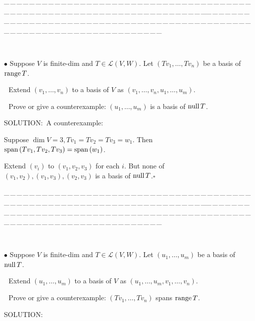 \documentclass[a4paper, 11pt, UTF8]{article}
\def\range{\textup{range}\,}
\def\null{\textup{null\,}}
\def\Spn{\textup{span}\,}
\def\Lm{\mathcal{L}}
\begin{document}
\begin{large}
{\tiny \_\,\_\,\_\,\_\,\_\,\_\,\_\,\_\,\_\,\_\,\_\,\_\,\_\,\_\,\_\,\_\,\_\,\_\,\_\,\_\,\_\,\_\,\_\,\_\,\_\,\_\,\_\,\_\,\_\,\_\,\_\,\_\,\_\,\_\,\_\,\_\,\_\,\_\,\_\,\_\,\_\,\_\,\_\,\_\,\_\,\_\,\_\,\_\,\_\,\_\,\_\,\_\,\_\,\_\,\_\,\_\,\_\,\_\,\_\,\_\,\_\,\_\,\_\,\_\,\_\,\_\,\_\,\_\,\_\,\_\,\_\_\,\_\,\_\,\_\,\_\,\_\,\_\,\_\,\_\,\_\,\_\,\_\,\_\,\_\,\_\,\_\,\_\,\_\,\_\,\_\,\_\,\_\,\_\,\_\,\_\,\_\,\_\,\_\,\_\,\_\,\_\,\_\,\_\,\_\,\_\,\_\,\_\,\_\,\_\,\_\,\_\,\_\,\_\,\_\,\_\,\_\,\_\,\_\,\_\,\_\,\_\,\_\,\_\,\_\,\_\,\_\,\_\,\_\,\_\,\_\,\_\,\_\,\_\,\_\,\_\,\_\,\_\,\_\,\_\,\_\,\_}{\tiny\,\par}
{\small $\bullet$} {\timessl\Large Suppose $V$ is finite-dim and $T\in\Lm(V,W)$. Let $(Tv_1,\dots,Tv_n)$ be a basis of $\range T$.}\par\,\,
{\timessl\Large Extend $(v_1,\dots,v_n)$ to a basis of $V$ as $(v_1,\dots,v_n,u_1,\dots,u_m)$.}\par\,\,
{\timessl\Large Prove or give a counterexample: $(u_1,\dots,u_m)$ is a basis of $\null T$.}\par
{\timesbf S\footnotesize{OLUTION:}}\,\,\,A counterexample:\par\quad
Suppose $\dim V=3, Tv_1=Tv_2=Tv_3=w_1.$ Then $\Spn(Tv_1,Tv_2,Tv_3)=\Spn(w_1)$.\par\quad
Extend $(v_i)$ to $(v_1,v_2,v_3)$ for each $i$. But none of $(v_1,v_2),(v_1,v_3),(v_2,v_3)$ is a basis of $\null T$.\quad$\square$\par
{\tiny \_\,\_\,\_\,\_\,\_\,\_\,\_\,\_\,\_\,\_\,\_\,\_\,\_\,\_\,\_\,\_\,\_\,\_\,\_\,\_\,\_\,\_\,\_\,\_\,\_\,\_\,\_\,\_\,\_\,\_\,\_\,\_\,\_\,\_\,\_\,\_\,\_\,\_\,\_\,\_\,\_\,\_\,\_\,\_\,\_\,\_\,\_\,\_\,\_\,\_\,\_\,\_\,\_\,\_\,\_\,\_\,\_\,\_\,\_\,\_\,\_\,\_\,\_\,\_\,\_\,\_\,\_\,\_\,\_\,\_\,\_\_\,\_\,\_\,\_\,\_\,\_\,\_\,\_\,\_\,\_\,\_\,\_\,\_\,\_\,\_\,\_\,\_\,\_\,\_\,\_\,\_\,\_\,\_\,\_\,\_\,\_\,\_\,\_\,\_\,\_\,\_\,\_\,\_\,\_\,\_\,\_\,\_\,\_\,\_\,\_\,\_\,\_\,\_\,\_\,\_\,\_\,\_\,\_\,\_\,\_\,\_\,\_\,\_\,\_\,\_\,\_\,\_\,\_\,\_\,\_\,\_\,\_\,\_\,\_\,\_\,\_\,\_\,\_\,\_\,\_\,\_}{\tiny\,\par}
{\small $\bullet$} {\timessl\Large Suppose $V$ is finite-dim and $T\in\Lm(V,W)$. Let $(u_1,\dots,u_m)$ be a basis of $\null T$.}\par\,\,
{\timessl\Large Extend $(u_1,\dots,u_m)$ to a basis of $V$ as $(u_1,\dots,u_m,v_1,\dots,v_n)$.}\par\,\,
{\timessl\Large Prove or give a counterexample: $(Tv_1,\dots,Tv_n)$ spans $\range T$.}\par
{\timesbf S\footnotesize{OLUTION:}}\par\quad

\end{large}
\end{document}
